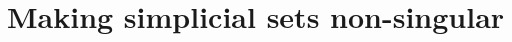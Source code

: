 \documentclass[final]{phduio} %
\begin{document}
    
    
    
    
    \part{Making simplicial sets non-singular} %
    
    
    
    
    
    


    \backmatter         %

    \printbibliography
\end{document}
